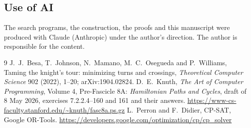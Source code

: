 \documentclass[11pt]{amsart}
\theoremstyle{remark}
\begin{document}
\subsection*{Use of AI}
The search programs, the construction, the proofs and this manuscript were produced with Claude (Anthropic) under
the author's direction. The author is responsible for the content.

\begin{thebibliography}{9}
 J.~J.~Besa, T.~Johnson, N.~Mamano, M.~C.~Osegueda and P.~Williams, Taming the knight's tour:
minimizing turns and crossings, \emph{Theoretical Computer Science} 902 (2022), 1--20; arXiv:1904.02824.
 D.~E.~Knuth, \emph{The Art of Computer Programming}, Volume 4, Pre-Fascicle 8A: \emph{Hamiltonian
Paths and Cycles}, draft of 8 May 2026, exercises 7.2.2.4--160 and 161 and their answers.
\url{https://www-cs-faculty.stanford.edu/~knuth/fasc8a.ps.gz}
 L.~Perron and F.~Didier, CP-SAT, Google OR-Tools.
\url{https://developers.google.com/optimization/cp/cp_solver}
\end{thebibliography}
\end{document}
